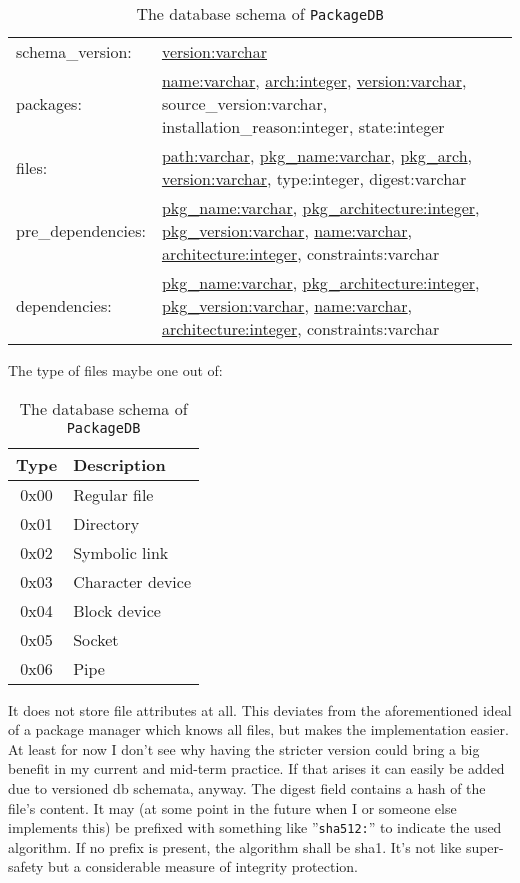 \documentclass[a4paper]{scrartcl}
\newcommand{\module}[1]{\texttt{#1}}
\begin{document}
	\begin{table}[H]
		\centering
		
		{
		\setlength{\extrarowheight}{0.5eM}
		\begin{tabularx}{\textwidth}{lX}
			schema\_version: & \underline{version:varchar} \\
			packages: & \underline{name:varchar}, \underline{arch:integer}, \underline{version:varchar}, source\_version:varchar, installation\_reason:integer, state:integer \\
			
			files: & \underline{path:varchar}, \underline{pkg\_name:varchar}, \underline{pkg\_arch}, \underline{version:varchar}, type:integer, digest:varchar \\
			
			pre\_dependencies: & \underline{pkg\_name:varchar}, \underline{pkg\_architecture:integer}, \underline{pkg\_version:varchar}, \underline{name:varchar}, \underline{architecture:integer}, constraints:varchar \\
			dependencies: & \underline{pkg\_name:varchar}, \underline{pkg\_architecture:integer}, \underline{pkg\_version:varchar}, \underline{name:varchar}, \underline{architecture:integer}, constraints:varchar \\
		\end{tabularx}
		}
	
		\vspace{1eM}
		The type of files maybe one out of:
		
		\vspace{0.5eM}
		\begin{tabular}{c|l}
			Type & Description \\
			\hline
			0x00 & Regular file \\
			0x01 & Directory \\
			0x02 & Symbolic link \\
			0x03 & Character device \\
			0x04 & Block device \\
			0x05 & Socket \\
			0x06 & Pipe \\
		\end{tabular}
	
		\caption{The database schema of \module{PackageDB}}
		\label{tab:the_database_schema_of_packagedb}
	\end{table}
	
	It does not store file attributes at all. This deviates from the aforementioned ideal of a package manager which knows all files, but makes the implementation easier. At least for now I don't see why having the stricter version could bring a big benefit in my current and mid-term practice. If that arises it can easily be added due to versioned db schemata, anyway. The digest field contains a hash of the file's content. It may (at some point in the future when I or someone else implements this) be prefixed with something like ''\texttt{sha512:}'' to indicate the used algorithm. If no prefix is present, the algorithm shall be sha1. It's not like super-safety but a considerable measure of integrity protection.
	
\end{document}
